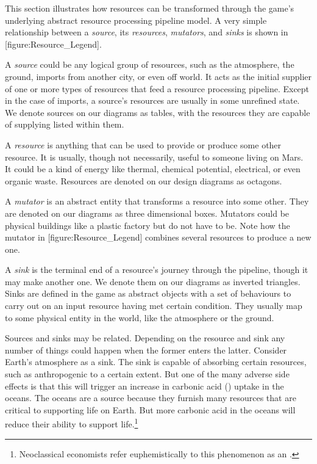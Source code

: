 
This section illustrates how resources can be transformed through the game's underlying abstract resource processing pipeline model. A very simple relationship between a {\it source}, its {\it resources}, {\it mutators}, and {\it sinks} is shown in [figure:Resource_Legend].

    {}

A {\it source} could be any logical group of resources, such as the atmosphere, the ground, imports from another city, or even off world. It acts as the initial supplier of one or more types of resources that feed a resource processing pipeline. Except in the case of imports, a source's resources are usually in some unrefined state. We denote sources on our diagrams as tables, with the resources they are capable of supplying listed within them.

A {\it resource} is anything that can be used to provide or produce some other resource. It is usually, though not necessarily, useful to someone living on Mars. It could be a kind of energy like thermal, chemical potential, electrical, or even organic waste. Resources are denoted on our design diagrams as octagons.

A {\it mutator} is an abstract entity that transforms a resource into some other. They are denoted on our diagrams as three dimensional boxes. Mutators could be physical buildings like a plastic factory but do not have to be. Note how the mutator in [figure:Resource_Legend] combines several resources to produce a new one.

A {\it sink} is the terminal end of a resource's journey through the pipeline, though it may make another one. We denote them on our diagrams as inverted triangles. Sinks are defined in the game as abstract objects with a set of behaviours to carry out on an input resource having met certain condition. They usually map to some physical entity in the world, like the atmosphere or the ground.

Sources and sinks may be related. Depending on the resource and sink any number of things could happen when the former enters the latter. Consider Earth's atmosphere as a sink. The sink is capable of absorbing certain resources, such as anthropogenic  to a certain extent. But one of the many adverse side effects is that this will trigger an increase in carbonic acid () uptake in the oceans. The oceans are a source because they furnish many resources that are critical to supporting life on Earth. But more carbonic acid in the oceans will reduce their ability to support life.\footnote{Neoclassical economists refer euphemistically to this phenomenon as an .}

